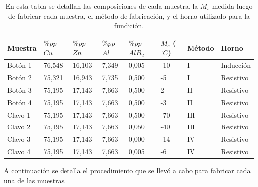 \documentclass[a4paper,12pt,fleqn,twoside,openany]{book}
\begin{document}
 \begin{table} %
 \begin{center}
 \begin{tabular}{@{}llllllll@{}}  \toprule
 Muestra & $\%pp$ $Cu$ & $\%pp$ $Zn$ & $\%pp$ $Al$ & $\%pp$ $AlB_2$& $M_s$ ($^\circ C$) & Método & Horno \\ \midrule
 Botón 1 & 76,548      & 16,103      & 7,349          & 0,005            &  -10  & I      & Inducción\\
 Botón 2 & 75,321      & 16,943      & 7,735          & 0,500             &  -5  & I      &Resistivo\\
 Botón 3 & 75,195      & 17,143      & 7,663          & 0,500             &  2  & II     &Resistivo \\
 Botón 4 & 75,195      & 17,143      & 7,663          & 0,500             &  -3  & II     & Resistivo \\
 Clavo 1 & 75,195      & 17,143      & 7,663          & 0,500             & -70      & III    & Resistivo \\
 Clavo 2 & 75,195      & 17,143      & 7,663         & 0,050             & -40      &  III   & Resistivo \\
 Clavo 3 & 75,195      & 17,143      & 7,663         & 0,000             & -14      &   IV   & Resistivo \\
 Clavo 4 & 75,195      & 17,143      & 7,663         & 0,005            &  -6      & IV     & Resistivo \\
 \bottomrule
 \end{tabular}
 \caption{En esta tabla se detallan las composiciones de cada muestra, la $M_s$ medida luego de fabricar cada muestra, el método de fabricación, y el horno utilizado para la fundición.}
 \label{tab:FabMuestras}
 \end{center}
 \end{table}

A continuación se detalla el procedimiento que se llevó a cabo para fabricar cada una de las muestras.
\end{document}
